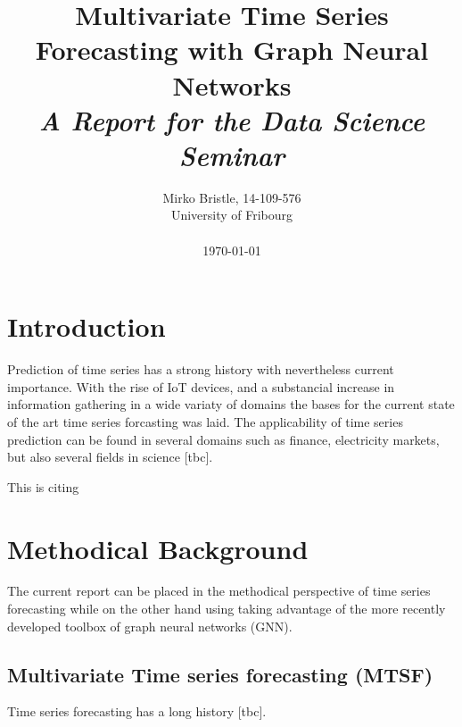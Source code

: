 \documentclass[letterpaper,twocolumn,12pt]{article}
\begin{document}
    \title{\Large \bf Multivariate Time Series Forecasting with Graph Neural Networks \\
    \Medium \it A Report for the Data Science Seminar
    }

    \author{
            {\rm Mirko Bristle, 14-109-576}\\
        University of Fribourg \\
        \\
        \today
    }
    \maketitle


%


    \section{Introduction}

    Prediction of time series has a strong history with nevertheless current importance. With the rise of IoT devices, and a substancial
    increase in information gathering in a wide variaty of domains the bases for the current state of the art time series forcasting was laid.
    The applicability of time series prediction can be found in several domains such as finance, electricity markets, but also several fields in science [tbc].


    This is citing \cite{wu2020connecting}


    \section{Methodical Background}
    The current report can be placed in the methodical perspective of time series forecasting while on the other hand using
    taking advantage of the more recently developed toolbox of graph neural networks (GNN).

    \subsection{Multivariate Time series forecasting (MTSF)}
    Time series forecasting has a long history [tbc].
\end{document}
